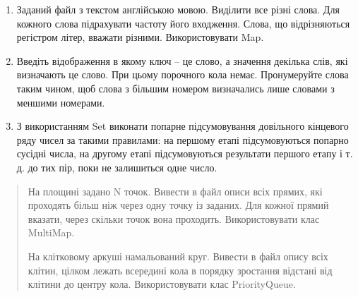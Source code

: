 \documentclass[]{article}
\begin{document}
\begin{enumerate}
\def\labelenumi{\arabic{enumi}.}
\item
  Заданий файл з текстом англійською мовою. Виділити все різні слова.
  Для кожного слова підрахувати частоту його входження. Слова, що
  відрізняються регістром літер, вважати різними. Використовувати Map.
\item
  Введіть відображення в якому ключ -- це слово, а значення декілька
  слів, які визначають це слово. При цьому порочного кола немає.
  Пронумеруйте слова таким чином, щоб слова з більшим номером
  визначались лише словами з меншими номерами.
\item
  З використанням Set виконати попарне підсумовування довільного
  кінцевого ряду чисел за такими правилами: на першому етапі
  підсумовуються попарно сусідні числа, на другому етапі підсумовуються
  результати першого етапу і т. д. до тих пір, поки не залишиться одне
  число.
\end{enumerate}

\begin{quote}
\protect\hypertarget{_Hlk65952346}{}{}На площині задано N точок. Вивести
в файл описи всіх прямих, які проходять більш ніж через одну точку із
заданих. Для кожної прямий вказати, через скільки точок вона проходить.
Використовувати клас MultiMap.

\protect\hypertarget{_Hlk65952056}{}{}На клітковому аркуші намальований
круг. Вивести в файл опису всіх клітин, цілком лежать всередині кола в
порядку зростання відстані від клітини до центру кола. Використовувати
клас PriorityQueue.

\protect\hypertarget{_Hlk65952360}{}{}
\end{quote}
\end{document}
